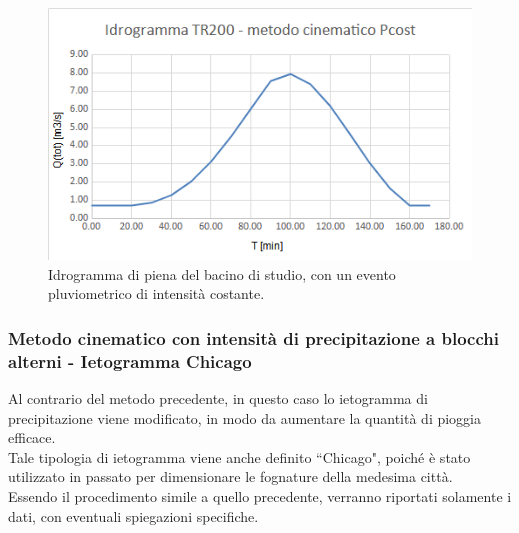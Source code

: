 \begin{figure}[H]  \centering
            \includegraphics[scale=0.8]{immagini/metodo_cinematico_p_cost.png}
            \caption{Idrogramma di piena del bacino di studio, con un evento pluviometrico di intensità costante.}
            \label{metodo_cinematico_p_cost}
\end{figure}

\subsubsection{Metodo cinematico con intensità di precipitazione a blocchi alterni - Ietogramma Chicago}
Al contrario del metodo precedente, in questo caso lo ietogramma di precipitazione viene modificato, in modo da aumentare la quantità di pioggia efficace.\\
Tale tipologia di ietogramma viene anche definito ``Chicago", poiché è stato utilizzato in passato per dimensionare le fognature della medesima città.\\
Essendo il procedimento simile a quello precedente, verranno riportati solamente i dati, con eventuali spiegazioni specifiche.


